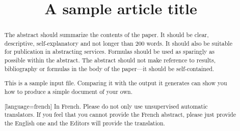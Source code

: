\documentclass[aihp]{imsart}
\theoremstyle{plain}
\theoremstyle{remark}
\begin{document}
\begin{frontmatter}
\title{A sample article title}


\begin{abstract}
The abstract should summarize the contents of the paper.
It should be clear, descriptive, self-explanatory and not longer
than 200 words. It should also be suitable for publication in
abstracting services. Formulas should be used as sparingly as
possible within the abstract. The abstract should not make
reference to results, bibliography or formulas in the body
of the paper---it should be self-contained.

This is a sample input file.  Comparing it with the output it
generates can show you how to produce a simple document of
your own.
\end{abstract}

\begin{abstract}[language=french]
In French. Please do not only use unsupervised automatic translators. If you feel that you cannot provide the French abstract, please just provide the English one and the Editors will provide the translation.
\end{abstract}

\begin{keyword}[class=MSC]
\end{keyword}

\begin{keyword}
\end{keyword}

\end{frontmatter}
\end{document}
